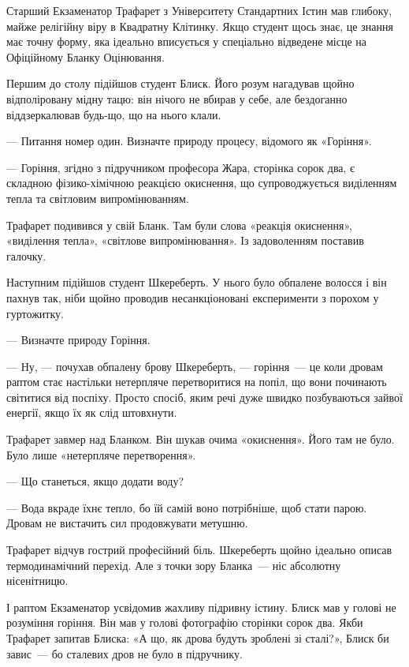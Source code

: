 \documentclass[12pt, a4paper, openany]{book}
\begin{document}
\begin{terrybox}
Старший Екзаменатор Трафарет з Університету Стандартних Істин мав глибоку, майже релігійну віру в Квадратну Клітинку. Якщо студент щось знає, це знання має точну форму, яка ідеально вписується у спеціально відведене місце на Офіційному Бланку Оцінювання.

Першим до столу підійшов студент Блиск. Його розум нагадував щойно відполіровану мідну тацю: він нічого не вбирав у себе, але бездоганно віддзеркалював будь-що, що на нього клали.

--- Питання номер один. Визначте природу процесу, відомого як «Горіння».

--- Горіння, згідно з підручником професора Жара, сторінка сорок два, є складною фізико-хімічною реакцією окиснення, що супроводжується виділенням тепла та світловим випромінюванням.

Трафарет подивився у свій Бланк. Там були слова «реакція окиснення», «виділення тепла», «світлове випромінювання». Із задоволенням поставив галочку.

\medskip
Наступним підійшов студент Шкереберть. У нього було обпалене волосся і він пахнув так, ніби щойно проводив несанкціоновані експерименти з порохом у гуртожитку.

--- Визначте природу Горіння.

--- Ну, --- почухав обпалену брову Шкереберть, --- горіння~--- це коли дровам раптом стає настільки нетерпляче перетворитися на попіл, що вони починають світитися від поспіху. Просто спосіб, яким речі дуже швидко позбуваються зайвої енергії, якщо їх як слід штовхнути.

Трафарет завмер над Бланком. Він шукав очима «окиснення». Його там не було. Було лише «нетерпляче перетворення».

--- Що станеться, якщо додати воду?

--- Вода вкраде їхнє тепло, бо їй самій воно потрібніше, щоб стати парою. Дровам не вистачить сил продовжувати метушню.

\medskip
Трафарет відчув гострий професійний біль. Шкереберть щойно ідеально описав термодинамічний перехід. Але з точки зору Бланка~--- ніс абсолютну нісенітницю.

І раптом Екзаменатор усвідомив жахливу підривну істину. Блиск мав у голові не розуміння горіння. Він мав у голові фотографію сторінки сорок два. Якби Трафарет запитав Блиска: «А що, як дрова будуть зроблені зі сталі?», Блиск би завис~--- бо сталевих дров не було в підручнику.


\end{terrybox}
\end{document}
